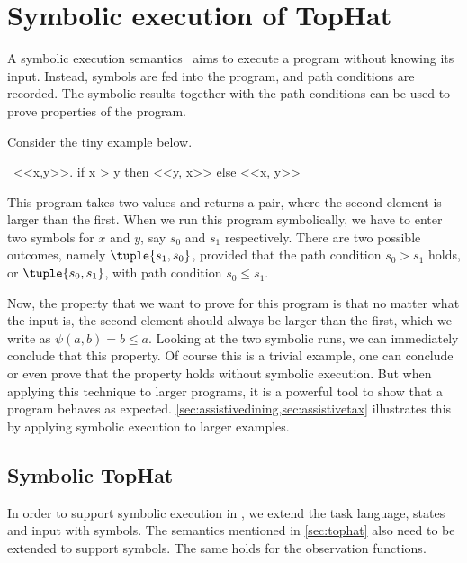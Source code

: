 
\section{Symbolic execution of TopHat}
\label{sec:symbolic}

A symbolic execution semantics~\cite{King1975,Boyer1975} aims to execute a program without knowing its input.
Instead, symbols are fed into the program, and path conditions are recorded.
The symbolic results together with the path conditions can be used to prove properties of the program.

Consider the tiny example below.
\begin{TASK}
  \ <<x,y>>. if x > y then <<y, x>> else <<x, y>>
\end{TASK}

This program takes two values and returns a pair, where the second element is larger than the first.
When we run this program symbolically, we have to enter two symbols for $x$ and $y$, say $s_0$ and $s_1$ respectively.
There are two possible outcomes, namely
$\tuple{s_1,s_0}$, provided that the path condition $s_0 > s_1$ holds, or
$\tuple{s_0,s_1}$, with path condition $s_0 \leq s_1$.

Now, the property that we want to prove for this program is that no matter what the input is, the second element should always be larger than the first, which we write as $\psi(a,b)= b \leq a$.
Looking at the two symbolic runs, we can immediately conclude that this property.
Of course this is a trivial example, one can conclude or even prove that the property holds without symbolic execution.
But when applying this technique to larger programs, it is a powerful tool to show that a program behaves as expected.
\cref{sec:assistivedining,sec:assistivetax} illustrates this by applying symbolic execution to larger examples.


\subsection{Symbolic TopHat}

In order to support symbolic execution in \TOPHAT, we extend the task language, states and input with symbols.
The semantics mentioned in \cref{sec:tophat} also need to be extended to support symbols.
The same holds for the observation functions.


